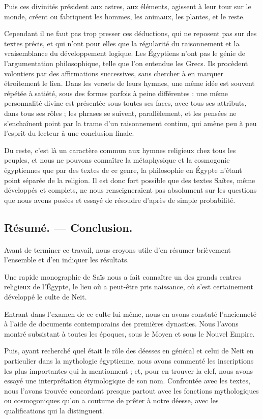 \documentclass[a4paper, 11pt, oneside]{article}
\begin{document}
Puis ces divinités président aux astres, aux éléments, agissent à leur tour sur le monde, créent ou fabriquent les hommes, les animaux, les plantes, et le reste.

Cependant il ne faut pas trop presser ces déductions, qui ne reposent pas sur des textes précis, et qui n'ont pour elles que la régularité du raisonnement et la vraisemblance du développement logique. Les Égyptiens n'ont pas le génie de l'argumentation philosophique, telle que l'on entendue les Grecs. Ils procèdent volontiers par des affirmations successives, sans chercher à en marquer étroitement le lien. Dans les versets de leurs hymnes, une même idée est souvent répétée à satiété, sous des formes parfois à peine différentes : une même personnalité divine est présentée sous toutes ses faces, avec tous ses attributs, dans tous ses rôles ; les phrases se suivent, parallèlement, et les pensées ne s'enchaînent point par la trame d'un raisonnement continu, qui amène peu à peu l'esprit du lecteur à une conclusion finale.

Du reste, c'est là un caractère commun aux hymnes religieux chez tous les peuples, et nous ne pouvons connaître la métaphysique et la cosmogonie égyptiennes que par des textes de ce genre, la philosophie en Égypte n'étant point séparée de la religion. Il est donc fort possible que des textes Saïtes, même développés et complets, ne nous renseigneraient pas absolument sur les questions que nous avons posées et essayé de résoudre d'après de simple probabilité.
\clearpage
\subsection{Résumé. --- Conclusion.}
\paragraph{}
Avant de terminer ce travail, nous croyons utile d'en résumer brièvement l'ensemble et d'en indiquer les résultats.

Une rapide monographie de Saïs nous a fait connaître un des grands centres religieux de l'Égypte, le lieu où a peut-être pris naissance, où s'est certainement développé le culte de Neit.

Entrant dans l'examen de ce culte lui-même, nous en avons constaté l'ancienneté à l'aide de documents contemporains des premières dynasties. Nous l'avons montré subsistant à toutes les époques, sous le Moyen et sous le Nouvel Empire.

Puis, ayant recherché quel était le rôle des déesses en général et celui de Neit en particulier dans la mythologie égyptienne, nous avons commenté les inscriptions les plus importantes qui la mentionnent ; et, pour en trouver la clef, nous avons essayé une interprétation étymologique de son nom. Confrontée avec les textes, nous l'avons trouvée concordant presque partout avec les fonctions mythologiques ou cosmogoniques qu'on a coutume de prêter à notre déesse, avec les qualifications qui la distinguent.
\end{document}
